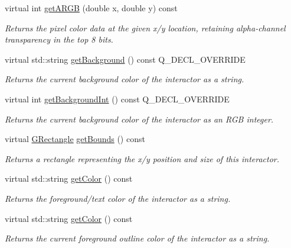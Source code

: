 \begin{DoxyCompactItemize}
virtual int \mbox{\hyperlink{classGDrawingSurface_ae394d39f20476570e083918d991c25bd}{get\+A\+R\+GB}} (double x, double y) const
\begin{DoxyCompactList}\small\item\em Returns the pixel color data at the given x/y location, retaining alpha-\/channel transparency in the top 8 bits. \end{DoxyCompactList}\item 
virtual std\+::string \mbox{\hyperlink{classGCanvas_ab44f928b6bd7c8e4b82d5ed92bc3d4c6}{get\+Background}} () const Q\+\_\+\+D\+E\+C\+L\+\_\+\+O\+V\+E\+R\+R\+I\+DE
\begin{DoxyCompactList}\small\item\em Returns the current background color of the interactor as a string. \end{DoxyCompactList}\item 
virtual int \mbox{\hyperlink{classGCanvas_af66f525e8154dbc8dcd2daecf3728ba9}{get\+Background\+Int}} () const Q\+\_\+\+D\+E\+C\+L\+\_\+\+O\+V\+E\+R\+R\+I\+DE
\begin{DoxyCompactList}\small\item\em Returns the current background color of the interactor as an R\+GB integer. \end{DoxyCompactList}\item 
virtual \mbox{\hyperlink{classGRectangle}{G\+Rectangle}} \mbox{\hyperlink{classGInteractor_a29e6ac35a0b48f491a4c88194cc5da3b}{get\+Bounds}} () const
\begin{DoxyCompactList}\small\item\em Returns a rectangle representing the x/y position and size of this interactor. \end{DoxyCompactList}\item 
virtual std\+::string \mbox{\hyperlink{classGInteractor_aa061dfa488c31e18549d64363c1d0e34}{get\+Color}} () const
\begin{DoxyCompactList}\small\item\em Returns the foreground/text color of the interactor as a string. \end{DoxyCompactList}\item 
virtual std\+::string \mbox{\hyperlink{classGDrawingSurface_aa061dfa488c31e18549d64363c1d0e34}{get\+Color}} () const
\begin{DoxyCompactList}\small\item\em Returns the current foreground outline color of the interactor as a string. \end{DoxyCompactList}\item 

\end{DoxyCompactItemize}
